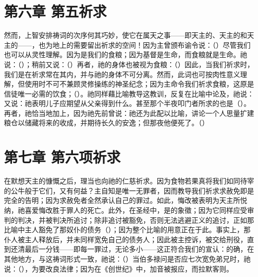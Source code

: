 
\section{第六章 第五祈求}

然而，上智安排祷词的次序何其巧妙，使它在属天之事——即天主的、天主的和天主的——，也为地上的需要留出祈求的空间！因为主曾颁布谕令说：（）尽管我们也可以从灵性理解。因为是我们的食粮；因为基督是生命，而食粮就是生命。祂说：（）；稍前又说：（）再者，祂的身体也被视为食粮：（）因此，当我们祈求时，我们是在祈求常在其内，并与祂的身体不可分离。然而，此词也可按肉性意义理解，但使用时不可不兼顾灵修操练的神圣纪念；因为主命令我们祈求食粮，这原是信徒唯一必需的饮食；（）。祂同样藉比喻教导这教训，反复在比喻中论及，祂说：又说：祂表明儿子应期望从父亲得到什么。甚至那个半夜叩门者所求的也是（）。再者，祂恰当地加上，因为祂先前曾说：祂还为此配以比喻，讲论一个人思量扩建粮仓以储藏将来的收成，并期待长久的安逸；但那夜他便死了。（）\par


\section{第七章 第六项祈求}

在默想天主的慷慨之后，理当也向祂的仁慈祈求。因为食物若果真将我们如同待宰的公牛般于它们，又有何益？主自知是唯一无罪者，因而教导我们祈求求赦免即是完全的告明；因为求赦免者全然承认自己的罪过。如此，悔改被表明为天主所悦纳，祂喜爱悔改胜于罪人的死亡。此外，在圣经中，是的象徵；因为它同样应受审判的判决，并被判决所追讨；除非追讨被豁免，否则无法逃避正义的追讨，正如那比喻中主人豁免了那奴仆的债务（）；因为整个比喻的用意正在于此。事实上，那仆人被主人释放后，并未同样宽免自己的债务人；因此被主控诉，被交给刑役，直到还清最后一分钱——即每一罪过，无论多小——这正符合我们的宣认：的确，在其他地方，与这祷词形式一致，祂说：（）当伯多禄问是否应七次宽免弟兄时，祂说：（），为要改良法律；因为在《创世纪》中，加音被报应，而拉默客则。\par

